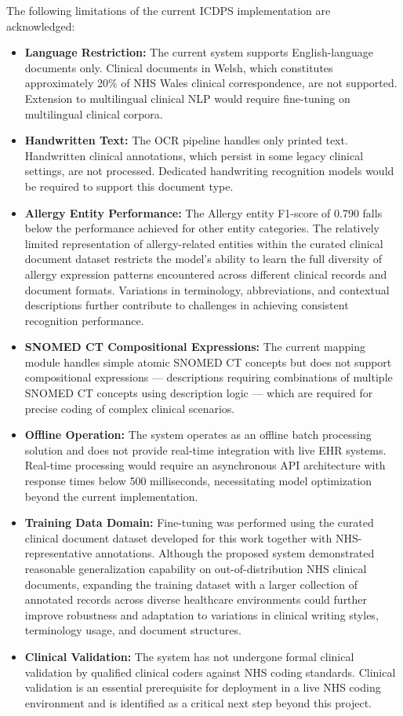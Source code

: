 The following limitations of the current ICDPS implementation are acknowledged:
\begin{itemize}
    \item \textbf{Language Restriction:} The current system supports English-language documents only. Clinical documents in Welsh, which constitutes approximately 20\% of NHS Wales clinical correspondence, are not supported. Extension to multilingual clinical NLP would require fine-tuning on multilingual clinical corpora.
    \item \textbf{Handwritten Text:} The OCR pipeline handles only printed text. Handwritten clinical annotations, which persist in some legacy clinical settings, are not processed. Dedicated handwriting recognition models would be required to support this document type.
    \item \textbf{Allergy Entity Performance:} The Allergy entity F1-score of 0.790 falls below the performance achieved for other entity categories. The relatively limited representation of allergy-related entities within the curated clinical document dataset restricts the model's ability to learn the full diversity of allergy expression patterns encountered across different clinical records and document formats. Variations in terminology, abbreviations, and contextual descriptions further contribute to challenges in achieving consistent recognition performance.
    \item \textbf{SNOMED CT Compositional Expressions:} The current mapping module handles simple atomic SNOMED CT concepts but does not support compositional expressions --- descriptions requiring combinations of multiple SNOMED CT concepts using description logic --- which are required for precise coding of complex clinical scenarios.
    \item \textbf{Offline Operation:} The system operates as an offline batch processing solution and does not provide real-time integration with live EHR systems. Real-time processing would require an asynchronous API architecture with response times below 500 milliseconds, necessitating model optimization beyond the current implementation.
    \item \textbf{Training Data Domain:} Fine-tuning was performed using the curated clinical document dataset developed for this work together with NHS-representative annotations. Although the proposed system demonstrated reasonable generalization capability on out-of-distribution NHS clinical documents, expanding the training dataset with a larger collection of annotated records across diverse healthcare environments could further improve robustness and adaptation to variations in clinical writing styles, terminology usage, and document structures.
    \item \textbf{Clinical Validation:} The system has not undergone formal clinical validation by qualified clinical coders against NHS coding standards. Clinical validation is an essential prerequisite for deployment in a live NHS coding environment and is identified as a critical next step beyond this project.
\end{itemize}


